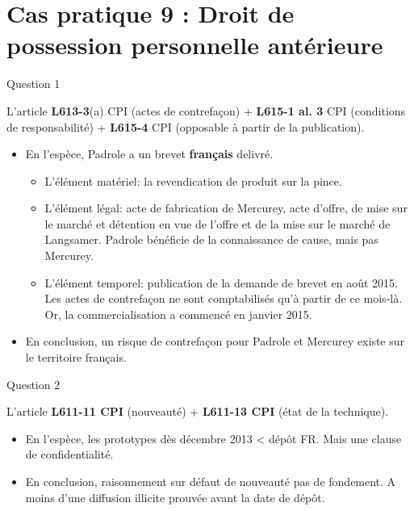 
\section[Cas 9]{Cas pratique 9 : Droit de possession
personnelle antérieure}

\begin{frame}{Question 1}

\begin{block}{}
L'article \textbf{L613-3}(a) CPI (actes de contrefaçon)
+ \textbf{L615-1 al. 3} CPI (conditions de responsabilité)
+ \textbf{L615-4} CPI (opposable à partir de la publication).
\end{block}

\begin{itemize}
  \item En l'espèce, Padrole a un brevet \textbf{français} delivré.
  \begin{itemize}
    \item L'élément matériel: la revendication de produit sur la
  pince.
    \item L'élément légal: acte de fabrication de Mercurey,
  acte d'offre, de mise sur le marché et détention en vue
  de l'offre et de la mise sur le marché de Langsamer.
  Padrole bénéficie de la connaissance de cause, mais
  pas Mercurey.
    \item L'élément temporel: publication de la demande de brevet
  en août 2015. Les actes de contrefaçon ne sont comptabilisés
  qu'à partir de ce mois-là. Or, la commercialisation a
  commencé en janvier 2015. 
  \end{itemize}
  \item En conclusion, un risque de contrefaçon pour Padrole
  et Mercurey existe sur le territoire français.
\end{itemize}

\end{frame}

\begin{frame}{Question 2}

\begin{block}{}
L'article \textbf{L611-11 CPI} (nouveauté)
+ \textbf{L611-13 CPI} (état de la technique).
\end{block}

\begin{itemize}
  \item En l'espèce, les prototypes dès décembre 2013 < dépôt FR.
  Mais une clause de confidentialité.
  \item En conclusion, raisonnement sur défaut de nouveauté
  pas de fondement. A moins d'une diffusion illicite
  prouvée avant la date de dépôt.
\end{itemize}

\end{frame}

